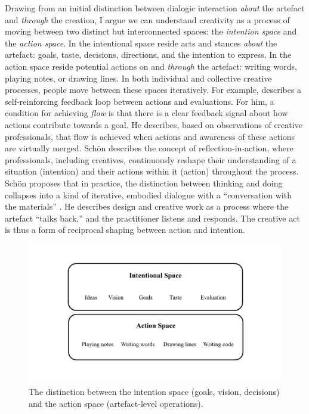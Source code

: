 Drawing from an initial distinction between dialogic interaction \textit{about} the artefact and \textit{through} the creation, I argue we can understand creativity as a process of moving between two distinct but interconnected spaces: the \textit{intention space} and the \textit{action space}. In the intentional space reside acts and stances \textit{about} the artefact: goals, taste, decisions, directions, and the intention to express. In the action space reside potential actions on and \textit{through} the artefact: writing words, playing notes, or drawing lines. In both individual and collective creative processes, people move between these spaces iteratively. For example, \cite{Csikszentmihalyi1997-ui} describes a self-reinforcing feedback loop between actions and evaluations. For him, a condition for achieving \textit{flow} is that there is a clear feedback signal about how actions contribute towards a goal. He describes, based on observations of creative professionals, that flow is achieved when actions and awareness of these actions are virtually merged. Schön \cite{Schon1987-fy} describes the concept of reflection-in-action, where professionals, including creatives, continuously reshape their understanding of a situation (intention) and their actions within it (action) throughout the process. Schön proposes that in practice, the distinction between thinking and doing collapses into a kind of iterative, embodied dialogue with a “conversation with the materials” \cite{Schon1992-jt}. He describes design and creative work as a process where the artefact “talks back,” and the practitioner listens and responds. The creative act is thus a form of reciprocal shaping between action and intention.


\begin{figure}[H]
    \centering
    \includegraphics[width=1\linewidth]{intention action spaces.png}
    \caption{The distinction between the intention space (goals, vision, decisions) and the action space (artefact-level operations).}
    \label{fig:intention-action-spaces}
\end{figure}

